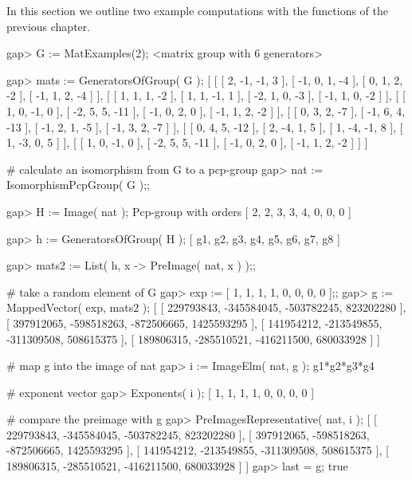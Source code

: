 
In this section we outline two example computations with the functions
of the previous chapter. 


\beginexample
gap> G := MatExamples(2);
<matrix group with 6 generators>

gap> mats := GeneratorsOfGroup( G );
[ [ [ 2, -1, -1, 3 ], [ -1, 0, 1, -4 ], [ 0, 1, 2, -2 ], [ -1, 1, 2, -4 ] ],
  [ [ 1, 1, 1, -2 ], [ 1, 1, -1, 1 ], [ -2, 1, 0, -3 ], [ -1, 1, 0, -2 ] ],
  [ [ 1, 0, -1, 0 ], [ -2, 5, 5, -11 ], [ -1, 0, 2, 0 ], [ -1, 1, 2, -2 ] ],
  [ [ 0, 3, 2, -7 ], [ -1, 6, 4, -13 ], [ -1, 2, 1, -5 ], [ -1, 3, 2, -7 ] ],
  [ [ 0, 4, 5, -12 ], [ 2, -4, 1, 5 ], [ 1, -4, -1, 8 ], [ 1, -3, 0, 5 ] ],
  [ [ 1, 0, -1, 0 ], [ -2, 5, 5, -11 ], [ -1, 0, 2, 0 ], [ -1, 1, 2, -2 ] ] ]

# calculate an isomorphism from G to a pcp-group
gap> nat := IsomorphismPcpGroup( G );;   
     
gap> H := Image( nat );
Pcp-group with orders [ 2, 2, 3, 3, 4, 0, 0, 0 ]

gap> h := GeneratorsOfGroup( H );
[ g1, g2, g3, g4, g5, g6, g7, g8 ]

gap> mats2 := List( h, x -> PreImage( nat, x ) );;

# take a random element of G
gap> exp :=  [ 1, 1, 1, 1, 0, 0, 0, 0 ];;
gap> g := MappedVector( exp, mats2 );
[ [ 229793843, -345584045, -503782245, 823202280 ],
  [ 397912065, -598518263, -872506665, 1425593295 ],
  [ 141954212, -213549855, -311309508, 508615375 ],
  [ 189806315, -285510521, -416211500, 680033928 ] ]

# map g into the image of nat
gap> i := ImageElm( nat, g );
g1*g2*g3*g4

# exponent vector 
gap> Exponents( i );
[ 1, 1, 1, 1, 0, 0, 0, 0 ]

# compare the preimage with g
gap> PreImagesRepresentative( nat, i );
[ [ 229793843, -345584045, -503782245, 823202280 ],
  [ 397912065, -598518263, -872506665, 1425593295 ],
  [ 141954212, -213549855, -311309508, 508615375 ],
  [ 189806315, -285510521, -416211500, 680033928 ] ]
gap> last = g;
true

